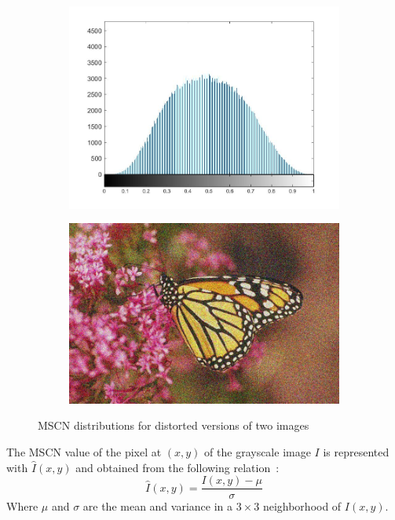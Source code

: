 \begin{figure}
\begin{subfigure}[b]{0.23\textwidth}
         \includegraphics[width=\textwidth]{./figs/mscn_histmnoise}
         \caption{}
         \label{fig:nss15}
     \end{subfigure}
     \begin{subfigure}[b]{0.23\textwidth}
         \centering
         \includegraphics[width=\textwidth]{./figs/mnoise}
         \caption{}
         \label{fig:nss16}
     \end{subfigure}
        \caption{MSCN distributions for distorted versions of two images}
        \label{fig:nss}
\end{figure}
The MSCN value of the pixel at $(x, y)$ of the grayscale image $I$ is represented with $\hat{I}(x, y)$ and obtained from the following relation~\cite{Mittal2012a}:
\begin{equation}
    \hat{I}(x, y) = \frac{I(x, y)-\mu}{\sigma}
    \label{eq:mscn}
\end{equation}
Where $\mu$ and $\sigma$ are the mean and variance in a $3\times3$ neighborhood of $I(x, y)$. 

